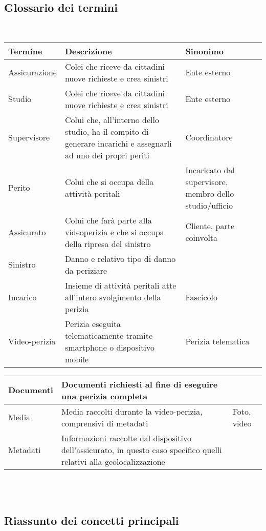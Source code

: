 \documentclass[a4paper,12pt]{report}
\begin{document}
\subsection{Glossario dei termini}
\mbox{}\\
\def\arraystretch{2}%
\begin{tabularx}{\textwidth}{ m{3cm} | m{6cm} | m{3cm}}
    \textbf{Termine} & \textbf{Descrizione} & \textbf{Sinonimo} \\
\hline
Assicurazione & Colei che riceve da cittadini nuove richieste e crea sinistri & Ente esterno\\ \hline
Studio & Colei che riceve da cittadini nuove richieste e crea sinistri & Ente esterno\\ \hline
Supervisore & Colui che, all’interno dello studio, ha il compito di generare incarichi e assegnarli ad uno dei propri periti & Coordinatore\\ \hline
Perito & Colui che si occupa della attività peritali & Incaricato dal supervisore, membro dello studio/ufficio\\ \hline
Assicurato & Colui che farà parte alla videoperizia e che si occupa della ripresa del sinistro & Cliente, parte coinvolta\\ \hline
Sinistro & Danno e relativo tipo di danno da periziare & \\ \hline
Incarico & Insieme di attività peritali atte all’intero svolgimento della perizia & Fascicolo\\ \hline
Video-perizia & Perizia eseguita telematicamente tramite smartphone o dispositivo mobile & Perizia telematica\\ 

\end{tabularx}

\def\arraystretch{2}%
\begin{tabularx}{\textwidth}{ m{3cm} | m{6cm} | m{3cm}}
Documenti & Documenti richiesti al fine di eseguire una perizia completa & \\ \hline
Media & Media raccolti durante la video-perizia, comprensivi di metadati & Foto, video\\ \hline
Metadati & Informazioni raccolte dal dispositivo dell’assicurato, in questo caso specifico quelli relativi alla geolocalizzazione & \\
\end{tabularx}
\\
\\

\subsection{Riassunto dei concetti principali}
\end{document}
